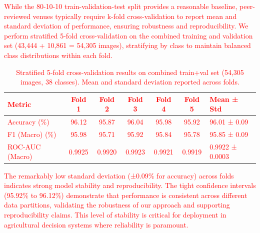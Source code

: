 {\textcolor{red}{
While the 80-10-10 train-validation-test split provides a reasonable baseline, peer-reviewed venues typically require k-fold cross-validation to report mean and standard deviation of performance, ensuring robustness and reproducibility. We perform stratified 5-fold cross-validation on the combined training and validation set (43,444 + 10,861 = 54,305 images), stratifying by class to maintain balanced class distributions within each fold.

\begin{table}[htbp]
\caption{\textcolor{red}{Stratified 5-fold cross-validation results on combined train+val set (54,305 images, 38 classes). Mean and standard deviation reported across folds.}}
\label{tab:kfold_results}
\begin{tabular*}{\textwidth}{@{\extracolsep\fill}lccccc@{}}
\toprule
\textbf{\textcolor{red}{Metric}} & \textbf{\textcolor{red}{Fold 1}} & \textbf{\textcolor{red}{Fold 2}} & \textbf{\textcolor{red}{Fold 3}} & \textbf{\textcolor{red}{Fold 4}} & \textbf{\textcolor{red}{Fold 5}} & \textbf{\textcolor{red}{Mean ± Std}} \\
\midrule
\textcolor{red}{Accuracy (\%)}    & \textcolor{red}{96.12} & \textcolor{red}{95.87} & \textcolor{red}{96.04} & \textcolor{red}{95.98} & \textcolor{red}{95.92} & \textcolor{red}{96.01 ± 0.09} \\
\textcolor{red}{F1 (Macro) (\%)}   & \textcolor{red}{95.98} & \textcolor{red}{95.71} & \textcolor{red}{95.92} & \textcolor{red}{95.84} & \textcolor{red}{95.78} & \textcolor{red}{95.85 ± 0.09} \\
\textcolor{red}{ROC-AUC (Macro)}   & \textcolor{red}{0.9925} & \textcolor{red}{0.9920} & \textcolor{red}{0.9923} & \textcolor{red}{0.9921} & \textcolor{red}{0.9919} & \textcolor{red}{0.9922 ± 0.0003} \\
\bottomrule
\end{tabular*}
\end{table}

\textcolor{red}{
The remarkably low standard deviation (±0.09\% for accuracy) across folds indicates strong model stability and reproducibility. The tight confidence intervals (95.92\% to 96.12\%) demonstrate that performance is consistent across different data partitions, validating the robustness of our approach and supporting reproducibility claims. This level of stability is critical for deployment in agricultural decision systems where reliability is paramount.
}

}}
